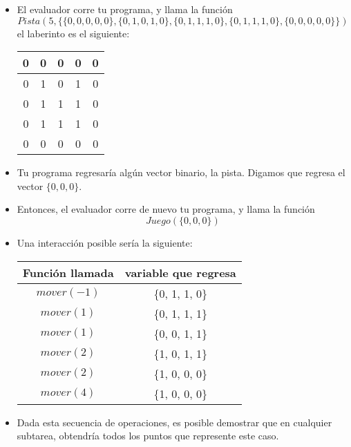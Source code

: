 \documentclass[12pt]{scrartcl}
\begin{document}

        \begin{itemize}
            \item El evaluador corre tu programa, y llama la función
            $$Pista(5, \{\{0, 0, 0, 0, 0\}, \{0, 1, 0, 1, 0\}, \{0, 1, 1, 1, 0\}, \{0, 1, 1, 1, 0\}, \{0, 0, 0, 0, 0\} \})$$
            el laberinto es el siguiente:
            \begin{center}
                \begin{tabular}{|c|c|c|c|c|}
                    \hline
                     0 & 0 & 0 & 0 & 0 \\
                     \hline
                     0 & 1 & 0 & 1 & 0 \\
                     \hline
                     0 & 1 & 1 & 1 & 0 \\
                     \hline
                     0 & 1 & 1 & 1 & 0 \\
                     \hline
                     0 & 0 & 0 & 0 & 0 \\
                     \hline
                \end{tabular}
            \end{center}
        \item Tu programa regresaría algún vector binario, la pista. Digamos que regresa el vector $\{0, 0, 0\}$.

        \item Entonces, el evaluador corre de nuevo tu programa, y llama la función 
        $$Juego(\{0, 0, 0\})$$
        \item Una interacción posible sería la siguiente:
        \begin{center}
            \begin{tabular}{|c|c|}
                \hline
                 Función llamada & variable que regresa \\
                 \hline
                 $mover(-1)$ & \{0, 1, 1, 0\} \\
                 \hline
                 $mover(1)$ & \{0, 1, 1, 1\} \\
                 \hline
                 $mover(1)$ & \{0, 0, 1, 1\} \\
                 \hline
                 $mover(2)$ & \{1, 0, 1, 1\} \\
                 \hline
                 $mover(2)$ & \{1, 0, 0, 0\} \\
                 \hline
                 $mover(4)$ & \{1, 0, 0, 0\} \\
                 \hline
                 
            \end{tabular}
            
        \end{center}
        \item Dada esta secuencia de operaciones, es posible demostrar que en cualquier subtarea, obtendría todos los puntos que represente este caso. 
        \end{itemize}
\end{document}
